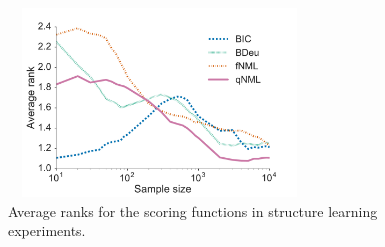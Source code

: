 
\begin{figure}[h]
\centering
\includegraphics[width=8cm,height=5cm]{qNML_images/shd_rank_all.pdf}
\caption{Average ranks for the scoring functions in structure learning experiments.}
\label{fig:shd_ranks}
\end{figure}


%

